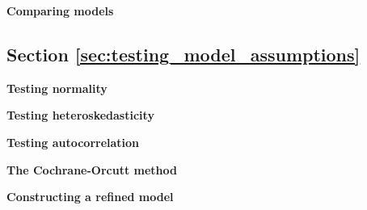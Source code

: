 \begin{exercise}
\label{ex:comparing_models}

\textbf{Comparing models}




\end{exercise}

\subsection{Section \ref{sec:testing_model_assumptions}}

\begin{exercise}
\label{ex:normality_test}

\textbf{Testing normality}





\end{exercise}

\begin{exercise}
\label{ex:breusch_pagan}

\textbf{Testing heteroskedasticity}




\end{exercise}

\begin{exercise}
\label{ex:breusch_godfrey_test}

\textbf{Testing autocorrelation}




\end{exercise}

\begin{exercise}
\label{ex:cochrane_orcutt}

\textbf{The Cochrane-Orcutt method}






\end{exercise}

\begin{exercise}
\label{ex:Leave_out_independent}

\textbf{Constructing a refined model}



\end{exercise}

